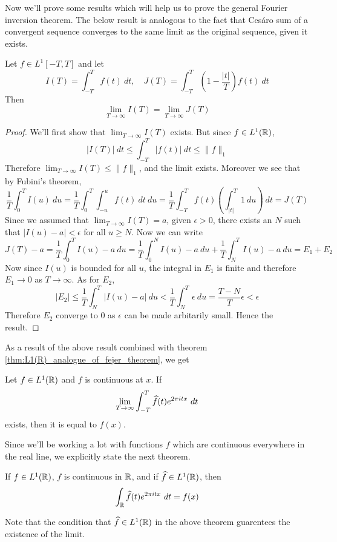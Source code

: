 Now we'll prove some results which will help us to prove the general Fourier inversion theorem. The below result is analogous to the fact that Ces\'aro sum of a convergent sequence converges to the same limit as the original sequence, given it exists.
\begin{proposition}
  \label{prop:cesaro_integral_converge_to_same_limit}
  Let $f \in L^1[-T, T]$ and let $$I(T) = \int_{-T}^T f(t) \ dt, \quad J(T) = \int_{-T}^T\left(1-\frac{|t|}{T}\right)f(t)\ dt$$
  Then $$\lim_{T\to \infty} I(T) = \lim_{T\to \infty}J(T)$$
\end{proposition}
\begin{proof}
  We'll first show that $\lim_{T\to \infty}I(T)$ exists. But since $f\in L^1(\mathbb R)$, $$|I(T)| \ dt \le \int_{-T}^T |f(t)| \ dt \le \|f\|_1$$
  Therefore $\lim_{T \to \infty}I(T) \le \|f\|_1$, and the limit exists. Moreover we see that by Fubini's theorem, $$\frac{1}{T} \int_0^T I(u) \ du = \frac{1}{T} \int_0^T\int_{-u}^u f(t) \ dt \ du = \frac{1}{T}\int_{-T}^T f(t) \left(\int_{|t|}^T 1 \ du \right) \ dt = J(T)$$
  Since we assumed that $\lim_{T\to \infty} I(T) = a$, given $\epsilon > 0$, there exists an $N$ such that $|I(u) - a| < \epsilon$ for all $u \ge N$. Now we can write $$J(T) - a = \frac{1}{T}\int_0^T I(u) - a \ du = \frac{1}{T}\int_0^N I(u) - a \ du + \frac{1}{T}\int_N^T I(u) - a \ du = E_1 + E_2$$
  Now since $I(u)$ is bounded for all $u$, the integral in $E_1$ is finite and therefore $E_1 \to 0$ as $T\to \infty$. As for $E_2$, $$|E_2| \le \frac{1}{T} \int_N^T |I(u) -a| \ du < \frac{1}{T}\int_N^T \epsilon \ du = \frac{T-N}{T}\epsilon < \epsilon$$
  Therefore $E_2$ converge to 0 as $\epsilon$ can be made arbitarily small. Hence the result. %
\end{proof}

As a result of the above result combined with theorem \ref{thm:L1(R)_analogue_of_fejer_theorem}, we get
\begin{corollary}
  Let $f\in L^1(\mathbb R)$ and $f$ is continuous at $x$. If $$\lim_{T\to \infty} \int_{-T}^T\widehat{f}(t)e^{2\pi itx} \ dt$$
  exists, then it is equal to $f(x)$.
\end{corollary}

Since we'll be working a lot with functions $f$ which are continuous everywhere in the real line, we explicitly state the next theorem.
\begin{theorem}
  If $f\in L^1(\mathbb R)$, $f$ is continuous in $\mathbb R$, and if $\widehat{f} \in L^1(\mathbb R)$, then $$\int_\mathbb R \widehat{f}(t)e^{2\pi itx} \ dt = f(x)$$
\end{theorem}
Note that the condition that $\widehat{f} \in L^1(\mathbb R)$ in the above theorem guarentees the existence of the limit.

